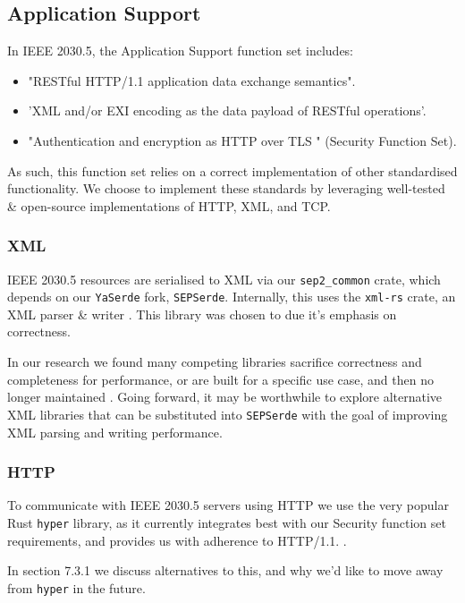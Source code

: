 \subsection{Application Support}
In IEEE 2030.5, the Application Support function set includes:

\begin{itemize}
    \item "RESTful HTTP/1.1 application data exchange semantics".
    \item 'XML and/or EXI encoding as the data payload of RESTful operations'.
    \item "Authentication and encryption as HTTP over TLS " (Security Function Set).
\end{itemize}

\cite{IEEE2030.5}

As such, this function set relies on a correct implementation of other standardised functionality. We choose to implement these standards by leveraging well-tested \& open-source implementations of HTTP, XML, and TCP.

\subsubsection{XML}
IEEE 2030.5 resources are serialised to XML via our \texttt{sep2\_common} crate, which depends on our \texttt{YaSerde} fork, \texttt{SEPSerde}. Internally, this uses the \texttt{xml-rs} crate, an XML parser \& writer \cite{xmlrs}. This library was chosen to due it's emphasis on correctness. 

In our research we found many competing libraries sacrifice correctness and completeness for performance, or are built for a specific use case, and then no longer maintained \cite{xmlrsperformance}.
Going forward, it may be worthwhile to explore alternative XML libraries that can be substituted into \texttt{SEPSerde} with the goal of improving XML parsing and writing performance. 

\subsubsection{HTTP}
To communicate with IEEE 2030.5 servers using HTTP we use the very popular Rust \texttt{hyper} library, as it currently integrates best with our Security function set requirements, and provides us with adherence to HTTP/1.1. \cite{hyper}.

In section 7.3.1 we discuss alternatives to this, and why we'd like to move away from \texttt{hyper} in the future.

